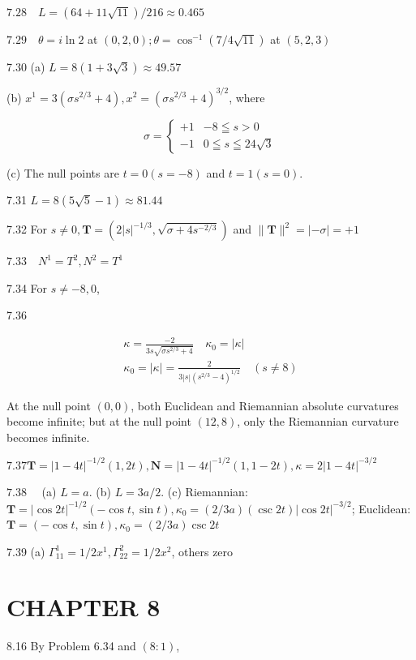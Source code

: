 \documentclass[10pt]{article}
\begin{document}
$7.28 \quad L=(64+11 \sqrt{11}) / 216 \approx 0.465$

$7.29 \quad \theta=i \ln 2$ at $(0,2,0) ; \theta=\cos ^{-1}(7 / 4 \sqrt{11})$ at $(5,2,3)$

7.30 (a) $L=8(1+3 \sqrt{3}) \approx 49.57$

(b) $x^{1}=3\left(\sigma s^{2 / 3}+4\right), x^{2}=\left(\sigma s^{2 / 3}+4\right)^{3 / 2}$, where

$$
\sigma=\left\{\begin{array}{lr}
+1 & -8 \leqq s>0 \\
-1 & 0 \leqq s \leqq 24 \sqrt{3}
\end{array}\right.
$$

(c) The null points are $t=0(s=-8)$ and $t=1(s=0)$.

7.31 $L=8(5 \sqrt{5}-1) \approx 81.44$

7.32 For $s \neq 0, \mathbf{T}=\left(2|s|^{-1 / 3}, \sqrt{\sigma+4 s^{-2 / 3}}\right)$ and $\|\mathbf{T}\|^{2}=|-\sigma|=+1$

$7.33 \quad N^{1}=T^{2}, N^{2}=T^{1}$

7.34 For $s \neq-8,0$,

7.36

$$
\begin{gathered}
\kappa=\frac{-2}{3 s \sqrt{\sigma s^{2 / 3}+4}} \quad \kappa_{0}=|\kappa| \\
\kappa_{0}=|\kappa|=\frac{2}{3|s|\left(s^{2 / 3}-4\right)^{1 / 2}} \quad(s \neq 8)
\end{gathered}
$$

At the null point $(0,0)$, both Euclidean and Riemannian absolute curvatures become infinite; but at the null point $(12,8)$, only the Riemannian curvature becomes infinite.

$7.37 \mathbf{T}=|1-4 t|^{-1 / 2}(1,2 t), \mathbf{N}=|1-4 t|^{-1 / 2}(1,1-2 t), \kappa=2|1-4 t|^{-3 / 2}$

$7.38 \quad$ (a) $L=a$. (b) $L=3 a / 2$. (c) Riemannian: $\mathbf{T}=|\cos 2 t|^{-1 / 2}(-\cos t, \sin t), \kappa_{0}=(2 / 3 a)(\csc 2 t)|\cos 2 t|^{-3 / 2}$; Euclidean: $\mathbf{T}=(-\cos t, \sin t), \kappa_{0}=(2 / 3 a) \csc 2 t$

7.39 (a) $\Gamma_{11}^{1}=1 / 2 x^{1}, \Gamma_{22}^{2}=1 / 2 x^{2}$, others zero

\section*{CHAPTER 8}
8.16 By Problem 6.34 and $(8: 1)$,
\end{document}
